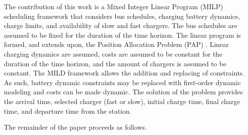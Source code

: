 \documentclass[letterpaper, 10pt, conference]{IEEEtran}
\begin{document}
The contribution of this work is a Mixed Integer Linear Program (MILP) scheduling framework that considers bus schedules, charging battery dynamics, charge limits, and availability of slow and fast chargers. The bus schedules are assumed to be fixed for the duration of the time horizon. The linear program is formed, and extends upon, the Position Allocation Problem (PAP) \cite{Qarebagh2019}. Linear charging dynamics are assumed, costs are assumed to be constant for the duration of the time horizon, and the amount of chargers is assumed to be constant. The MILD framework allows the addition and replacing of constraints. As such, battery dynamic constraints may be replaced with first-order dynamic modeling and costs can be made dynamic. The solution of the problem provides the arrival time, selected charger (fast or slow), initial charge time, final charge time, and departure time from the station.

The remainder of the paper proceeds as follows.
\end{document}
